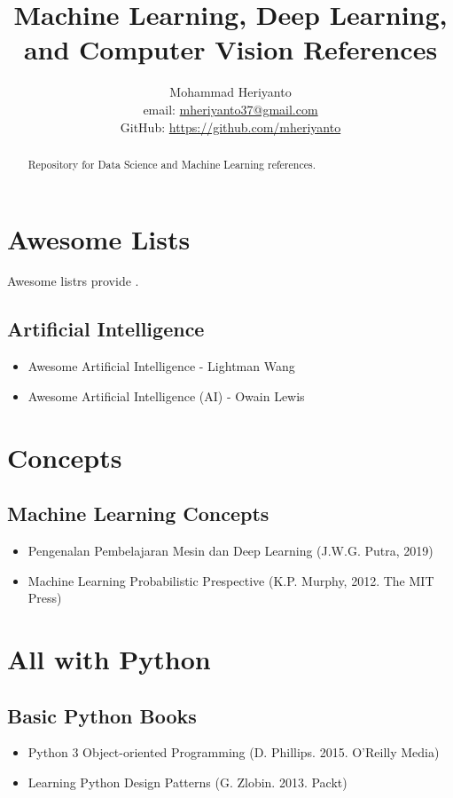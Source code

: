 \documentclass[12pt,oneside,a4paper]{article}
\begin{document}
\title{Machine Learning, Deep Learning, and Computer Vision References}
\author{Mohammad Heriyanto \\ email: \href{mailto:mheriyanto37@gmail.com}{mheriyanto37@gmail.com} \\ GitHub: \href{https://github.com/mheriyanto/Data-Science-and-Machine-Learning-References}{https://github.com/mheriyanto}}
   
\maketitle

\begin{abstract}
Repository for Data Science and Machine Learning references.
\end{abstract}

\section{Awesome Lists}
Awesome listrs provide .

\subsection{Artificial Intelligence}
\begin{itemize}
\item Awesome Artificial Intelligence - Lightman Wang
\item Awesome Artificial Intelligence (AI) - Owain Lewis
\end{itemize}

\section{Concepts}
\subsection{Machine Learning Concepts}
\begin{itemize}
\item Pengenalan Pembelajaran Mesin dan Deep Learning (J.W.G. Putra, 2019)
\item Machine Learning Probabilistic Prespective (K.P. Murphy, 2012. The MIT Press)
\end{itemize}

\section{All with Python}
\subsection{Basic Python Books}
\begin{itemize}
\item Python 3 Object-oriented Programming (D. Phillips. 2015. O'Reilly Media)
\item Learning Python Design Patterns (G. Zlobin. 2013. Packt)
\end{itemize}
\end{document}
